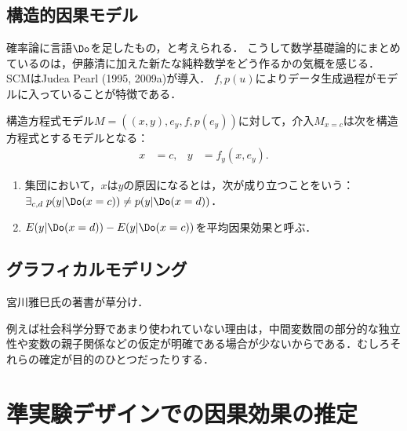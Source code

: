 \documentclass[uplatex,dvipdfmx]{jsreport}
\begin{document}
\subsection{構造的因果モデル}

\begin{tcolorbox}[colframe=ForestGreen, colback=ForestGreen!10!white,breakable,colbacktitle=ForestGreen!40!white,coltitle=black,fonttitle=\bfseries\sffamily,
title=]
    確率論に言語$\Do$を足したもの，と考えられる．
    こうして数学基礎論的にまとめているのは，伊藤清に加えた新たな純粋数学をどう作るかの気概を感じる．
    SCMはJudea Pearl (1995, 2009a)が導入．
    $f,p(u)$によりデータ生成過程がモデルに入っていることが特徴である．
\end{tcolorbox}

\begin{definition}
    構造方程式モデル$M=((x,y),e_y,f,p(e_y))$に対して，介入$M_{x=c}$は次を構造方程式とするモデルとなる：
    \begin{align*}
        x&=c,&y&=f_y(x,e_y).
    \end{align*}
    \begin{enumerate}
        \item 集団において，$x$は$y$の原因になるとは，次が成り立つことをいう：$\exists_{c,d}\;p(y|\Do(x=c))\ne p(y|\Do(x=d))$．
        \item $E(y|\Do(x=d))-E(y|\Do(x=c))$を平均因果効果と呼ぶ．
    \end{enumerate}
\end{definition}

\subsection{グラフィカルモデリング}

\begin{tcolorbox}[colframe=ForestGreen, colback=ForestGreen!10!white,breakable,colbacktitle=ForestGreen!40!white,coltitle=black,fonttitle=\bfseries\sffamily,
title=]
    宮川雅巳氏の著書が草分け．
\end{tcolorbox}

\begin{discussion}[工学分野が主流]
    例えば社会科学分野であまり使われていない理由は，中間変数間の部分的な独立性や変数の親子関係などの仮定が明確である場合が少ないからである．むしろそれらの確定が目的のひとつだったりする．
\end{discussion}

\section{準実験デザインでの因果効果の推定}
\end{document}
